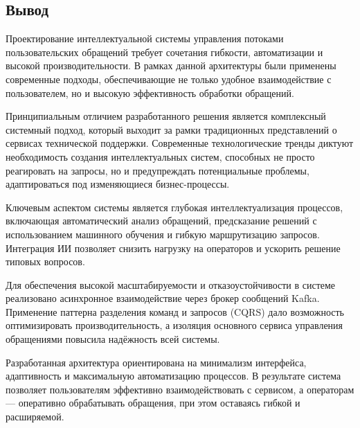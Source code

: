 \subsection{Вывод}

Проектирование интеллектуальной системы управления потоками пользовательских обращений требует сочетания гибкости, автоматизации и высокой производительности. В рамках данной архитектуры были применены современные подходы, обеспечивающие не только удобное взаимодействие с пользователем, но и высокую эффективность обработки обращений.

Принципиальным отличием разработанного решения является комплексный системный подход, который выходит за рамки традиционных представлений о сервисах технической поддержки. Современные технологические тренды диктуют необходимость создания интеллектуальных систем, способных не просто реагировать на запросы, но и предупреждать потенциальные проблемы, адаптироваться под изменяющиеся бизнес-процессы.

Ключевым аспектом системы является глубокая интеллектуализация процессов, включающая автоматический анализ обращений, предсказание решений с использованием машинного обучения и гибкую маршрутизацию запросов. Интеграция ИИ позволяет снизить нагрузку на операторов и ускорить решение типовых вопросов.

Для обеспечения высокой масштабируемости и отказоустойчивости в системе реализовано асинхронное взаимодействие через брокер сообщений Kafka. Применение паттерна разделения команд и запросов (CQRS) дало возможность оптимизировать производительность, а изоляция основного сервиса управления обращениями повысила надёжность всей системы.

Разработанная архитектура ориентирована на минимализм интерфейса, адаптивность и максимальную автоматизацию процессов. В результате система позволяет пользователям эффективно взаимодействовать с сервисом, а операторам — оперативно обрабатывать обращения, при этом оставаясь гибкой и расширяемой.
